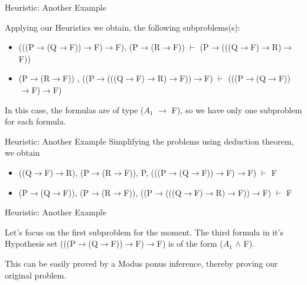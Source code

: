 \documentclass{beamer}
\begin{document}
\begin{frame}{Heuristic: Another Example}


Applying our Heuristics we obtain, the following subproblems(s):
  \begin{itemize}

\item 
\begin{center}

(((P$\rightarrow$(Q$\rightarrow$F))$\rightarrow$F)$\rightarrow$F),
(P$\rightarrow$(R$\rightarrow$F)) $\vdash$ (P$\rightarrow$(((Q$\rightarrow$F)$\rightarrow$R)$\rightarrow$F))

\end{center}

\item 
\begin{center}
(P$\rightarrow$(R$\rightarrow$F)) ,
((P$\rightarrow$(((Q$\rightarrow$F)$\rightarrow$R)$\rightarrow$F))$\rightarrow$F)
$\vdash$
(((P$\rightarrow$(Q$\rightarrow$F))$\rightarrow$F)$\rightarrow$F)
\end{center}

  \end{itemize}

In this case, the formulas are of type  ($A_{1}$ $\rightarrow$ F), so we have only one subproblem for each formula.


\end{frame}








\begin{frame}{Heuristic: Another Example}
  Simplifying the problems using deduction theorem, we obtain
 
\begin{itemize}

\item 
((Q$\rightarrow$F)$\rightarrow$R),
(P$\rightarrow$(R$\rightarrow$F)),
P,
(((P$\rightarrow$(Q$\rightarrow$F))$\rightarrow$F)$\rightarrow$F)
 $\vdash$ 
 F

\item 
(P$\rightarrow$(Q$\rightarrow$F)),
(P$\rightarrow$(R$\rightarrow$F)),\newline
\hspace{10 mm}
((P$\rightarrow$(((Q$\rightarrow$F)$\rightarrow$R)$\rightarrow$F))$\rightarrow$F)
$\vdash$
F
  \end{itemize}
\end{frame}


\begin{frame}{Heuristic: Another Example}

Let's focus on the first subproblem for the moment. 
The third formula in it's Hypothesis set  (((P$\rightarrow$(Q$\rightarrow$F))$\rightarrow$F)$\rightarrow$F) is of the form
($A_{1}$ $\wedge$ F).

This can be easily proved by a Modus ponus inference, thereby proving our original problem.
\end{frame}
\end{document}
